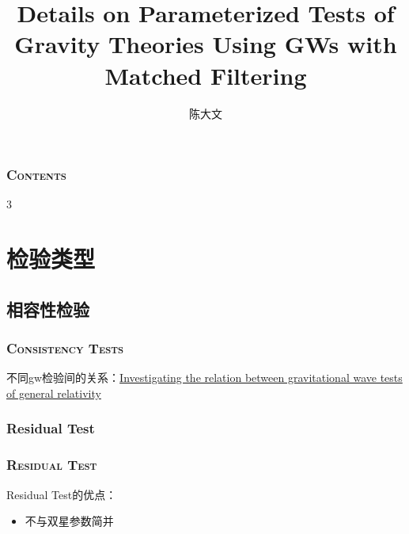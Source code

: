 \documentclass[CJK,aspectratio=169]{beamer}  %
\begin{document}
	
	\title{Details on Parameterized Tests of Gravity Theories Using GWs with Matched Filtering}
	\author[]{陈大文}
	
	\begin{frame}
		\vspace{0.5cm}
		\titlepage 
		\hypertarget{beginning}{}
	\end{frame}
	

	\begin{frame}   %
		\frametitle{\textsc{Contents}}
		\begin{multicols}{3}
			\tableofcontents
		\end{multicols}
	\end{frame}



\section{检验类型}

\subsection{相容性检验}

\begin{frame}
	\frametitle{\textsc{Consistency Tests}}
	\par 不同gw检验间的关系：\href{https://arxiv.org/abs/2109.06988}{Investigating the relation between gravitational wave tests of general relativity} \cite{gw_tests_relation}

\end{frame}

\subsubsection{Residual Test}
\begin{frame}
	\frametitle{\textsc{Residual Test}}
	Residual Test的优点：
	\begin{itemize}
		\item[1. ] 不与双星参数简并\cite{test_GR_GW150914}
	\end{itemize}

\end{frame}
\end{document}
